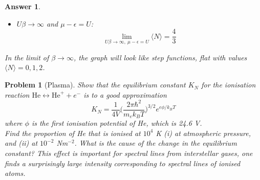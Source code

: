\documentclass[a4paper]{article}
\newtheorem{ans}{Answer}[section]
\theoremstyle{new}
\newtheorem{qns}{Problem}[section]
\begin{document}
\begin{ans}
\begin{itemize}
    $$\lim_{U\beta\rightarrow\infty,~\mu-\epsilon>0}\langle N\rangle=2$$
    Here, $\mu$ is so large that the reservoir floods all the energy levels, hence giving maximum occupancy.
    \item $U\beta\rightarrow\infty$ and $\mu-\epsilon=U$:
    $$\lim_{U\beta\rightarrow\infty,~\mu-\epsilon=U}\langle N\rangle=\frac{4}{3}$$
\end{itemize}
In the limit of $\beta\rightarrow\infty$, the graph will look like step functions, flat with values $\langle N\rangle=0,1,2$.
\begin{center}
\end{center}
\end{ans}
\begin{qns}[Plasma]
Show that the equilibrium constant $K_N$ for the ionisation reaction $\text{He}\leftrightarrow\text{He}^++e^-$ is to a good approximation
$$K_N=\frac{1}{4V}\bigg(\frac{2\pi\hbar^2}{m_ek_BT}\bigg)^{3/2}e^{e\phi/k_BT}$$
where $\phi$ is the first ionisation potential of He, which is 24.6 V.\\[5pt]
Find the proportion of He that is ionised at $10^4$ K (i) at atmospheric pressure, and (ii) at $10^{−2}$ Nm$^{−2}$. What is the cause of the change in the equilibrium constant? This effect is important for spectral lines from interstellar gases, one finds a surprisingly large intensity corresponding to spectral lines of ionised atoms.
\end{qns}
\end{document}
